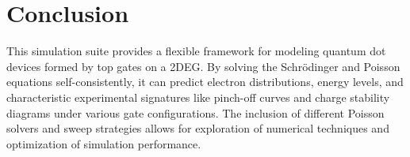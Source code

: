 \documentclass{article}
\begin{document}
\section{Conclusion}
This simulation suite provides a flexible framework for modeling quantum dot devices formed by top gates on a 2DEG. By solving the Schrödinger and Poisson equations self-consistently, it can predict electron distributions, energy levels, and characteristic experimental signatures like pinch-off curves and charge stability diagrams under various gate configurations. The inclusion of different Poisson solvers and sweep strategies allows for exploration of numerical techniques and optimization of simulation performance.
\end{document}

